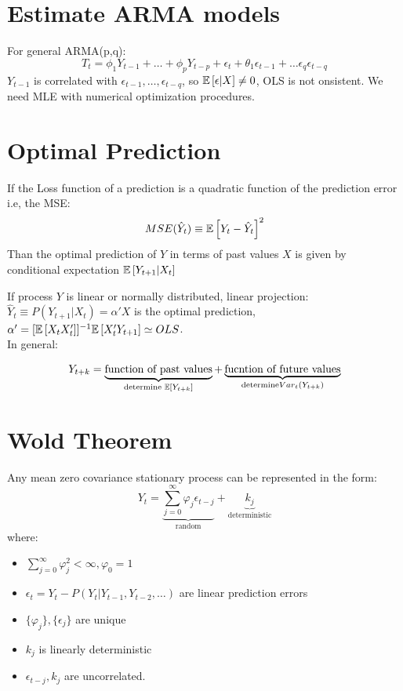 \section{Estimate ARMA models}
For general ARMA(p,q):
\[
T_t = \phi_1Y_{t-1} + \ldots + \phi_p Y_{t-p} + \epsilon_t + \theta_1 \epsilon_{t-1} + \ldots \epsilon_q
\epsilon_{t-q}\]
$Y_{t-1}$ is correlated with $\epsilon_{t-1},\ldots, \epsilon_{t-q}$, so $\mathbb{E}\left[ \epsilon | X\right] \neq 0$, OLS is not onsistent. We need MLE with numerical optimization procedures.

\section{Optimal Prediction}
\begin{mytheorem}
	If the Loss function of a prediction is a quadratic function of the prediction error i.e, the MSE:
	\[
	MSE(\hat{Y}_t)\equiv \mathbb{E}\left[Y_t - \hat{Y}_t\right]^2
	\]
Than the optimal prediction of $Y$ in terms of past values $X$ is given by conditional expectation $\mathbb{E}\left[Y_{t+1}|X_t\right]$
\end{mytheorem}
If process $Y$ is linear or normally distributed, linear projection: $\hat{Y}_t \equiv P (Y_{t+1}| X_t) = \alpha 'X$ is the optimal prediction, $\alpha' = [\mathbb{E}\left[X_tX'_t\right]]^{-1}\mathbb{E}\left[X'_t Y_{t+1}\right] \simeq OLS$.\\
In general:

\[
Y_{t+k} = \underbrace{\text{function of past values}}_{\text{determine } \mathbb{E}\left[Y_{t+k}\right]} + \underbrace{\text{fucntion of future values}}_{\text{determine} Var_t(Y_{t+k})}
\]
\section{Wold Theorem}
\begin{mytheorem}
	Any mean zero covariance stationary process can be represented in the form:
	\begin{equation}
			Y_t =  \underbrace{\sum_{j=0}^\infty \varphi_j \epsilon_{t-j}}_{\text{random}} + \underbrace{k_j}_{\text{deterministic}}
			\label{wold_theorem}
	\end{equation}
where:
\begin{itemize}
	\item $\sum_{j=0}^{\infty} \varphi_j^2 < \infty, \varphi_0 =1$
	\item $\epsilon_t = Y_t - P(Y_t | Y_{t-1}, Y_{t-2}, \ldots)$ are linear prediction errors
	\item $\{\varphi_j\}, \{\epsilon_j\}$ are unique
	\item $k_j$ is linearly deterministic
	\item $\epsilon_{t-j}, k_j$ are uncorrelated.
\end{itemize}
\end{mytheorem}
